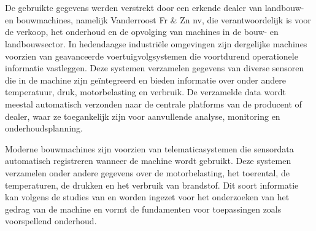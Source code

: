
\newpage

\section{}%
\label{sec: afkomst werkelijke verkregen data}

De gebruikte gegevens werden verstrekt door een erkende dealer van landbouw- en bouwmachines, namelijk Vanderroost Fr \& Zn nv, die verantwoordelijk is voor de verkoop, het onderhoud en de opvolging van machines in de bouw- en landbouwsector. In hedendaagse industriële omgevingen zijn dergelijke machines voorzien van geavanceerde voertuigvolgsystemen die voortdurend operationele informatie vastleggen. Deze systemen verzamelen gegevens van diverse sensoren die in de machine zijn geïntegreerd en bieden informatie over onder andere temperatuur, druk, motorbelasting en verbruik. De verzamelde data wordt meestal automatisch verzonden naar de centrale platforms van de producent of dealer, waar ze toegankelijk zijn voor aanvullende analyse, monitoring en onderhoudsplanning.

Moderne bouwmachines zijn voorzien van telematicasystemen die sensordata automatisch registreren wanneer de machine wordt gebruikt. Deze systemen verzamelen onder andere gegevens over de motorbelasting, het toerental, de temperaturen, de drukken en het verbruik van brandstof. Dit soort informatie kan volgens de studies van \textcite{Elahi2023} en \textcite{Kapoor2025} worden ingezet voor het onderzoeken van het gedrag van de machine en vormt de fundamenten voor toepassingen zoals voorspellend onderhoud.


